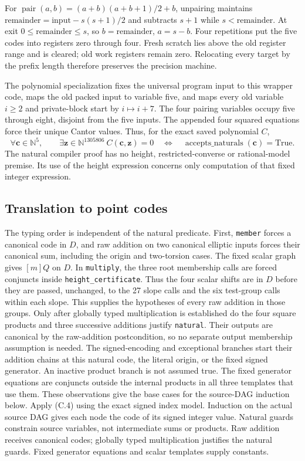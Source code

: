 \documentclass[11pt]{article}
\theoremstyle{definition}
\theoremstyle{remark}
\newcommand{\N}{\mathbb N}
\begin{document}
For $\operatorname{pair}(a,b)=(a+b)(a+b+1)/2+b$, unpairing maintains
$\text{remainder}=\text{input}-s(s+1)/2$ and subtracts $s+1$
while $s<\text{remainder}$. At exit
$0\le\text{remainder}\le s$, so $b=\text{remainder}$, $a=s-b$.
Four repetitions put the five codes into registers zero through four.
Fresh scratch lies above the old register range and is cleared;
old work registers remain zero. Relocating every target by the prefix
length therefore preserves the precision machine.

The polynomial specialization fixes the universal program input to
this wrapper code, maps the old packed input to variable five, and
maps every old variable $i\ge2$ and private-block start by $i\mapsto i+7$.
The four pairing variables occupy five through eight, disjoint from
the five inputs. The appended four squared equations force their
unique Cantor values. Thus, for the exact saved polynomial $C$,
\[
 \forall\mathbf c\in\N^5,\qquad
 \exists\mathbf z\in\N^{1305806}\ C(\mathbf c,\mathbf z)=0
 \quad\Longleftrightarrow\quad
        \operatorname{accepts\_naturals}(\mathbf c)=\mathrm{True}. \tag{C.4}
\]
The natural compiler proof has no height, restricted-converse or
rational-model premise. Its use of the height expression concerns
only computation of that fixed integer expression.

\subsection{Translation to point codes}
The typing order is independent of the natural predicate. First,
\texttt{member} forces a canonical code in $D$, and raw addition on two
canonical elliptic inputs forces their canonical sum, including the
origin and two-torsion cases. The fixed scalar graph gives $[m]Q$ on
$D$. In \texttt{multiply}, the three root membership calls are forced
conjuncts inside \texttt{height\_certificate}. Thus the four scalar shifts
are in $D$ before they are passed, unchanged, to the 27 slope calls and
the six test-group calls within each slope. This supplies the hypotheses
of every raw addition in those groups. Only after globally typed
multiplication is established do the four square products and three
successive additions justify \texttt{natural}. Their outputs are canonical
by the raw-addition postcondition, so no separate output membership
assumption is needed. The signed-encoding and exceptional branches start
their addition chains at this natural code, the literal origin, or the
fixed signed generator. An inactive product branch is not assumed true.
The fixed generator equations are conjuncts outside the internal products
in all three templates that use them. These observations give the base
cases for the source-DAG induction below.
Apply (C.4) using the exact signed index model. Induction on the actual
source DAG gives each node the code of its signed integer value.
Natural guards constrain source variables, not intermediate sums or
products. Raw addition receives canonical codes; globally typed
multiplication justifies the natural guards. Fixed generator equations
and scalar templates supply constants.
\end{document}
